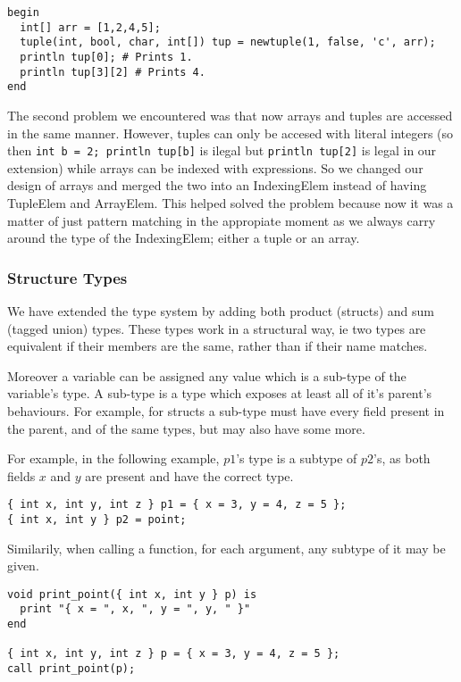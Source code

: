 \documentclass{article}
\begin{document}
\begin{lstlisting}
begin
  int[] arr = [1,2,4,5];
  tuple(int, bool, char, int[]) tup = newtuple(1, false, 'c', arr);
  println tup[0]; # Prints 1.
  println tup[3][2] # Prints 4.
end
\end{lstlisting}

The second problem we encountered was that now arrays and tuples are accessed in the same manner. However, tuples can only be accesed with literal integers (so
then \texttt{int b = 2; println tup[b]} is ilegal but \texttt{println tup[2]} is legal in our extension) while arrays can be indexed with expressions. So we changed our design of arrays and merged the two into an IndexingElem instead of having TupleElem and ArrayElem. This helped solved the problem because now it was a matter of just pattern matching in the appropiate moment as we always carry around the type of the IndexingElem; either a tuple or an array.


\subsubsection{Structure Types}
We have extended the type system by adding both product (structs) and sum (tagged union) types.
These types work in a structural way, ie two types are equivalent if their members are the same,
rather than if their name matches.

Moreover a variable can be assigned any value which is a sub-type of the variable's type. A
sub-type is a type which exposes at least all of it's parent's behaviours. For example, for structs
a sub-type must have every field present in the parent, and of the same types, but may also have some more.

For example, in the following example, $p1$'s type is a subtype of $p2$'s, as both fields $x$ and
$y$ are present and have the correct type.

\begin{lstlisting}
{ int x, int y, int z } p1 = { x = 3, y = 4, z = 5 };
{ int x, int y } p2 = point;
\end{lstlisting}

Similarily, when calling a function, for each argument, any subtype of it may be given.
\begin{lstlisting}
void print_point({ int x, int y } p) is
  print "{ x = ", x, ", y = ", y, " }"
end

{ int x, int y, int z } p = { x = 3, y = 4, z = 5 };
call print_point(p);
\end{lstlisting}
\end{document}
